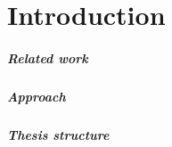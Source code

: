 \chapter*{Introduction}


\paragraph{Related work}


\paragraph{Approach}

\paragraph{Thesis structure}